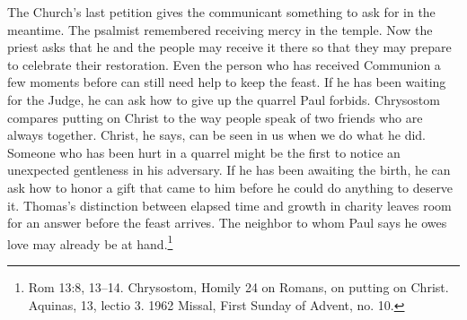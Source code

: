 The Church's last petition gives the communicant something to ask for in the meantime. The psalmist remembered receiving mercy in the temple. Now the priest asks that he and the people may receive it there so that they may prepare to celebrate their restoration. Even the person who has received Communion a few moments before can still need help to keep the feast. If he has been waiting for the Judge, he can ask how to give up the quarrel Paul forbids. Chrysostom compares putting on Christ to the way people speak of two friends who are always together. Christ, he says, can be seen in us when we do what he did. Someone who has been hurt in a quarrel might be the first to notice an unexpected gentleness in his adversary. If he has been awaiting the birth, he can ask how to honor a gift that came to him before he could do anything to deserve it. Thomas's distinction between elapsed time and growth in charity leaves room for an answer before the feast arrives. The neighbor to whom Paul says he owes love may already be at hand.\footnote{Rom 13:8, 13--14. Chrysostom, Homily 24 on Romans, on putting on Christ. Aquinas,  13, lectio 3. 1962 Missal, First Sunday of Advent, no. 10.}

